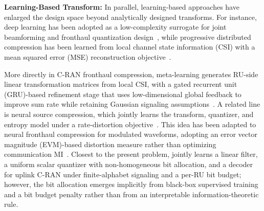 \documentclass[10pt, twocolumn, comsoc]{IEEEtran}
\begin{document}
{\bf{Learning-Based Transform:}}
In parallel, learning-based approaches have enlarged the design space beyond analytically designed transforms. For instance, deep learning has been adopted as a low-complexity surrogate for joint beamforming and fronthaul quantization design~\cite{yu2021deep}, while progressive distributed compression has been learned from local channel state information (CSI) with a mean squared error (MSE) reconstruction objective~\cite{sohrabi2022learning}.


More directly in C-RAN fronthaul compression, meta-learning generates RU-side linear transformation matrices from local CSI, with a gated recurrent unit (GRU)-based refinement stage that uses low-dimensional global feedback to improve sum rate while retaining Gaussian signaling assumptions~\cite{qiao2024meta}.
A related line is neural source compression, which jointly learns the transform, quantizer, and entropy model under a rate-distortion objective~\cite{balle2018variational}.
This idea has been adapted to neural fronthaul compression for modulated waveforms, adopting an error vector magnitude (EVM)-based distortion measure rather than optimizing communication MI~\cite{bian2025towards}.
Closest to the present problem, \cite{chene2024distributed} jointly learns a linear filter, a uniform scalar quantizer with non-homogeneous bit allocation, and a decoder for uplink C-RAN under finite-alphabet signaling and a per-RU bit budget; however, the bit allocation emerges implicitly from black-box supervised training and a bit budget penalty rather than from an interpretable information-theoretic rule.
\end{document}
